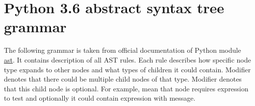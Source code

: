 \chapter{Python 3.6 abstract syntax tree grammar} 
\label{AppendixA} 

The following grammar is taken from official documentation of Python module \href{https://docs.python.org/3/library/ast.html}{ast}. It contains description of all AST rules. Each rule describes how specific node type expands to other nodes and what types of children it could contain. Modifier \code{*} denotes that there could be multiple child nodes of that type. Modifier  denotes that this child node is optional. For example,  mean that node  requires expression to test and optionally it could contain expression with message.

